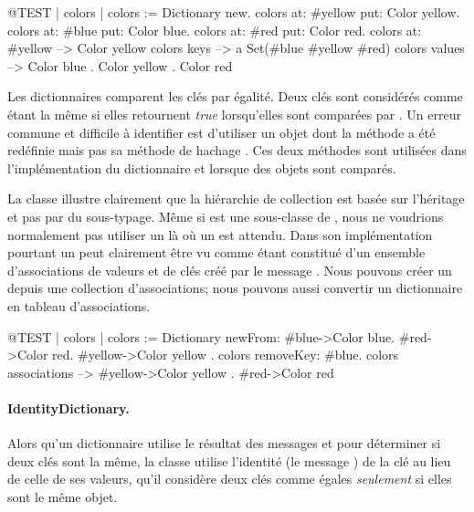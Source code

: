 \documentclass[a4paper,10pt,twoside]{book}
\begin{document}
\begin{code}{@TEST | colors |}
colors := Dictionary new.
colors at: #yellow put: Color yellow.
colors at: #blue put: Color blue.
colors at: #red put: Color red.
colors at: #yellow --> Color yellow
colors keys          --> a Set(#blue #yellow #red)
colors values       --> {Color blue . Color yellow . Color red}
\end{code}

Les dictionnaires comparent les cl\'es par \'egalit\'e. Deux cl\'es sont
consid\'er\'es comme \'etant la m\^eme si elles retournent \emph{true}
lorsqu'elles sont compar\'ees par \ct{=}. Un erreur commune et difficile \`a
identifier est d'utiliser un objet dont la m\'ethode \ct{=} a \'et\'e
red\'efinie mais pas sa m\'ethode de hachage . Ces deux
m\'ethodes sont utilis\'ees dans l'impl\'ementation du dictionnaire
et lorsque des objets sont compar\'es.

La classe  illustre clairement que la hi\'erarchie
de collection est bas\'ee sur l'h\'eritage et pas par du sous-typage.
M\^eme si  est une sous-classe de , nous
ne voudrions normalement pas utiliser un  l\`a o\`u
un  est attendu. 
Dans son impl\'ementation pourtant un  peut
clairement \^etre vu comme \'etant constitu\'e d'un ensemble d'associations
de valeurs et de cl\'es cr\'e\'e par le message . Nous
pouvons cr\'eer un  depuis une collection d'associations; nous
pouvons aussi convertir un dictionnaire en tableau d'associations.

\begin{code}{@TEST | colors |}
colors := Dictionary newFrom: { #blue->Color blue. #red->Color red. #yellow->Color yellow }.
colors removeKey: #blue.
colors associations --> {#yellow->Color yellow . #red->Color red}
\end{code}

\paragraph{IdentityDictionary.}
Alors qu'un dictionnaire utilise le r\'esultat des messages \ct{=} et  pour d\'eterminer si deux cl\'es sont la m\^eme, la classe  utilise l'identit\'e (\cad le message ) de
la cl\'e au lieu de celle de ses valeurs, \ie qu'il consid\`ere deux
cl\'es comme \'egales \emph{seulement} si elles sont le m\^eme objet.
\end{document}
